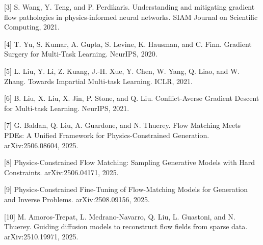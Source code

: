 \documentclass[UTF8,a4paper,12pt,fontset=none]{ctexart}
\begin{document}
[3] S. Wang, Y. Teng, and P. Perdikaris. Understanding and mitigating gradient flow pathologies in physics-informed neural networks. SIAM Journal on Scientific Computing, 2021.


[4] T. Yu, S. Kumar, A. Gupta, S. Levine, K. Hausman, and C. Finn. Gradient Surgery for Multi-Task Learning. NeurIPS, 2020.


[5] L. Liu, Y. Li, Z. Kuang, J.-H. Xue, Y. Chen, W. Yang, Q. Liao, and W. Zhang. Towards Impartial Multi-task Learning. ICLR, 2021.


[6] B. Liu, X. Liu, X. Jin, P. Stone, and Q. Liu. Conflict-Averse Gradient Descent for Multi-task Learning. NeurIPS, 2021.


[7] G. Baldan, Q. Liu, A. Guardone, and N. Thuerey. Flow Matching Meets PDEs: A Unified Framework for Physics-Constrained Generation. arXiv:2506.08604, 2025.


[8] Physics-Constrained Flow Matching: Sampling Generative Models with Hard Constraints. arXiv:2506.04171, 2025.


[9] Physics-Constrained Fine-Tuning of Flow-Matching Models for Generation and Inverse Problems. arXiv:2508.09156, 2025.


[10] M. Amoros-Trepat, L. Medrano-Navarro, Q. Liu, L. Guastoni, and N. Thuerey. Guiding diffusion models to reconstruct flow fields from sparse data. arXiv:2510.19971, 2025.
\end{document}
